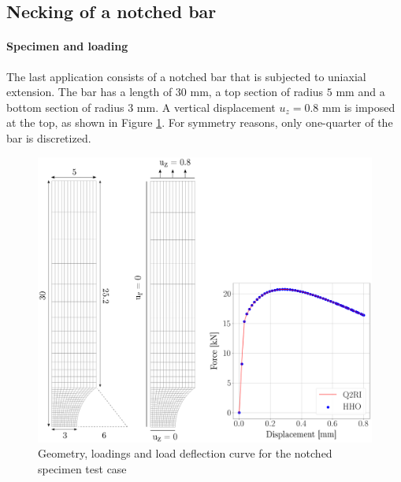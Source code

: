 \subsection{Necking of a notched bar}
\label{sec:hho_meca:notched_bar}

\paragraph{Specimen and loading}

The last application consists of a notched bar that is subjected to uniaxial
extension.
The bar has a length of $30$ mm, a top section of radius $5$ mm and a bottom section of radius $3$ mm.
A vertical
displacement $u_z = 0.8$ mm is imposed at the top, as shown in Figure \ref{fig_ssna_mesh}.
For symmetry reasons, only one-quarter of the
bar is discretized.

\begin{figure}[H]
    \centering
    \includegraphics[width=12.cm]{../chapter_002_hho_mechanics/drawings/ssna_mesh.png}
    \caption{
        Geometry, loadings and load deflection curve for the notched specimen test case
    }
    \label{fig_ssna_mesh}
\end{figure}

